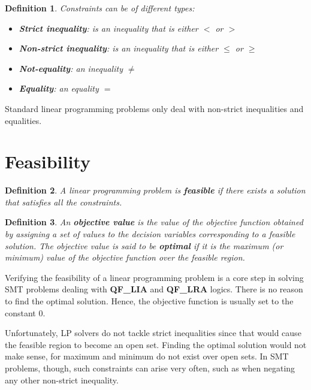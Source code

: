 \documentclass[preview,border=12pt,varwidth]{report}
\newtheorem{definition}{Definition}
\begin{document}
\begin{definition}
    Constraints can be of different types:

    \begin{itemize}
        \item \textbf{Strict inequality}: is an inequality that is either $<$ or $>$
        \item \textbf{Non-strict inequality}: is an inequality that is either $\leq$ or $\geq$
        \item \textbf{Not-equality}: an inequality $\neq$
        \item \textbf{Equality}: an equality $=$
    \end{itemize}
\end{definition}

Standard linear programming problems only deal with non-strict inequalities and equalities.

\section*{Feasibility}

\begin{definition}
    A linear programming problem is \textbf{feasible} if there exists a solution that satisfies all the constraints.
\end{definition}


\begin{definition}
    An \textbf{objective value} is the value of the objective function obtained by assigning a set of values to the decision variables corresponding to a feasible solution.
    The objective value is said to be \textbf{optimal} if it is the maximum (or minimum) value of the objective function over the feasible region.
\end{definition}

Verifying the feasibility of a linear programming problem is a core step in solving SMT problems dealing with \textbf{QF\_LIA} and \textbf{QF\_LRA} logics.
There is no reason to find the optimal solution. Hence, the objective function is usually set to the constant $0$.

Unfortunately, LP solvers do not tackle strict inequalities since that would cause the feasible region to become an open set.
Finding the optimal solution would not make sense, for maximum and minimum do not exist over open sets.
In SMT problems, though, such constraints can arise very often, such as when negating any other non-strict inequality.
\end{document}
